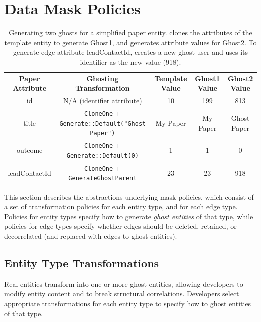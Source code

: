 \section{Data Mask Policies}
\label{sec:policies}

\begin{table}[h!]
    \centering
    \footnotesize
\begin{tabular}{@{}ccccc@{}}
\textbf{Paper Attribute} & \textbf{Ghosting Transformation} & \textbf{Template Value} & \textbf{Ghost1 Value} & \textbf{Ghost2 Value} 
  \\ \cmidrule(r){1-5}
    {id} & N/A (identifier attribute) & 10 & 199 & 813 \\
{title} & \texttt{CloneOne} + \texttt{Generate::Default("Ghost Paper")} & My Paper & My
    Paper & Ghost Paper \\
{outcome} & \texttt{CloneOne} + \texttt{Generate::Default(0)} & 1 & 1 & 0 \\
{leadContactId} & \texttt{CloneOne} + \texttt{GenerateGhostParent} & 23 & 23 & 918 \\
\end{tabular}
    \caption{Generating two ghosts for a simplified paper entity.
    \sys clones the attributes of the template entity to generate Ghost1, and generates
    attribute values for Ghost2. To generate edge attribute leadContactId, \sys creates a new ghost user and uses its identifier as the new value (918).}
    \label{tab:ghosting}
\end{table}

This section describes the abstractions underlying mask policies, which consist of a set of
transformation policies for each entity type, and for each edge type.
Policies for entity types specify how to generate \emph{ghost entities} of that type, while policies
for edge types specify whether edges should be deleted, retained, or decorrelated (and replaced with edges to ghost entities).

\subsection{Entity Type Transformations}
\label{sec:ghosting}

Real entities transform into one or more ghost entities, allowing developers to modify entity
content and to break structural correlations. 
Developers select appropriate transformations for each entity type to specify how to
ghost entities of that type.

